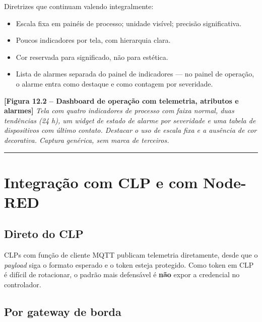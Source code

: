 Diretrizes que continuam valendo integralmente:

\begin{itemize}
\tightlist
\item
  Escala fixa em painéis de processo; unidade visível; precisão significativa.
\item
  Poucos indicadores por tela, com hierarquia clara.
\item
  Cor reservada para significado, não para estética.
\item
  Lista de alarmes separada do painel de indicadores --- no painel de operação, o alarme entra como destaque e como contagem por severidade.
\end{itemize}

\begin{caixafigura}

\textbf{{[}Figura 12.2 -- Dashboard de operação com telemetria, atributos e alarmes{]}}
\emph{Tela com quatro indicadores de processo com faixa normal, duas tendências (24 h), um widget de estado de alarme por severidade e uma tabela de dispositivos com último contato. Destacar o uso de escala fixa e a ausência de cor decorativa. Captura genérica, sem marca de terceiros.}

\end{caixafigura}

\begin{center}\rule{0.5\linewidth}{0.5pt}\end{center}

\section{Integração com CLP e com Node-RED}\label{integrauxe7uxe3o-com-clp-e-com-node-red}

\subsection{Direto do CLP}\label{direto-do-clp}

CLPs com função de cliente MQTT publicam telemetria diretamente, desde que o \emph{payload} siga o formato esperado e o token esteja protegido. Como token em CLP é difícil de rotacionar, o padrão mais defensável é \textbf{não} expor a credencial no controlador.

\subsection{Por gateway de borda}\label{por-gateway-de-borda}

